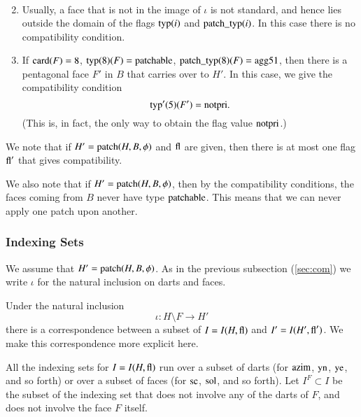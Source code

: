 \begin{definition}
\begin{enumerate}
$$\begin{array}{lll}
        \end{array}
        $$
    \item Usually, a face that is not in the image of $\iota$ is
    not standard, and hence lies outside the domain of the flags
    ${\operatorname{typ}}(i)$ and ${\operatorname{patch\_typ}}(i)$.  In this case there is
    no compatibility condition.
    \item If ${\operatorname{card}}(F)=8$, ${\operatorname{typ}}(8)(F)={\operatorname{patchable}}$,
    ${\operatorname{patch\_typ}}(8)(F) = {\operatorname{agg51}}$, then there is a
    pentagonal face $F'$ in $B$ that carries over to $H'$.  In this case, we
    give the compatibility condition
        $${\operatorname{typ}}'(5)(F') = {\operatorname{notpri}}.$$
    (This is, in fact, the only way to obtain the flag value
    ${\operatorname{notpri}}$.)
    \end{enumerate}
\end{definition}


\begin{remark}
We note that if $H'={\operatorname{patch}}(H,B,\phi)$ and ${\operatorname{fl}}$ are given,
then there is at most one flag ${\operatorname{fl}}'$ that gives
compatibility.
\end{remark}

\begin{remark}
We also note that if $H'={\operatorname{patch}}(H,B,\phi)$, then by the
compatibility conditions, the faces coming from $B$ never have
type ${\operatorname{patchable}}$. This means that we can never apply one
patch upon another.
\end{remark}

\subsubsection{Indexing Sets}

We assume that $H' = {\operatorname{patch}}(H,B,\phi)$. As in the previous
subsection (\ref{sec:com}) we write $\iota$ for the natural
inclusion  on darts and faces.

Under the natural inclusion
    $$\iota:H\setminus F \to H'$$
there is a correspondence between a subset of $I=I(H,{\operatorname{fl}})$ and
$I'=I(H',{\operatorname{fl}}')$.  We make this correspondence more explicit
here.



All the indexing sets for $I=I(H,{\operatorname{fl}})$ run over a subset of
darts (for ${\operatorname{azim}}$, ${\operatorname{yn}}$, ${\operatorname{ye}}$, and so forth) or
over a subset of faces (for ${\operatorname{sc}}$, ${\operatorname{sol}}$, and so forth).
Let $I^F\subset I$ be the subset of the indexing set that does not
involve any of the darts of $F$, and does not involve the face $F$
itself.

